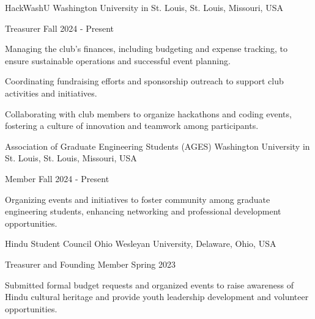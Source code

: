 \documentclass[10pt, letterpaper]{article}
\begin{document}
\begin{leadershipentry}
    {HackWashU} %
    {Washington University in St. Louis, St. Louis, Missouri, USA} %
    \begin{positionentry}
        {Treasurer} %
        {Fall 2024 - Present} %
        \item Managing the club's finances, including budgeting and expense tracking, to ensure sustainable operations and successful event planning.
        \item Coordinating fundraising efforts and sponsorship outreach to support club activities and initiatives.
        \item Collaborating with club members to organize hackathons and coding events, fostering a culture of innovation and teamwork among participants.
    \end{positionentry}
\end{leadershipentry}

\begin{leadershipentry}
    {Association of Graduate Engineering Students (AGES)} %
    {Washington University in St. Louis, St. Louis, Missouri, USA} %
    \begin{positionentry}
        {Member} %
        {Fall 2024 - Present} %
        \item Organizing events and initiatives to foster community among graduate engineering students, enhancing networking and professional development opportunities.
    \end{positionentry}
\end{leadershipentry}

\begin{leadershipentry}
    {Hindu Student Council} %
    {Ohio Wesleyan University, Delaware, Ohio, USA} %
    \begin{positionentry}
        {Treasurer and Founding Member} %
        {Spring 2023} %
        \item Submitted formal budget requests and organized events to raise awareness of Hindu cultural heritage and provide youth leadership development and volunteer opportunities.
    \end{positionentry}
\end{leadershipentry}
\end{document}
